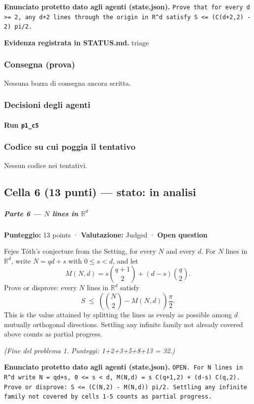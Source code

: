 \documentclass[11pt,a4paper]{article}
\begin{document}
\textbf{Enunciato protetto dato agli agenti (state.json).} \texttt{Prove that for every d \textgreater{}= 2, any d+2 lines through the origin in R\textasciicircum{}d satisfy S \textless{}= (C(d+2,2) - 2) pi/2.}

\textbf{Evidenza registrata in STATUS.md.} triage

\subsubsection{Consegna (prova)}
Nessuna bozza di consegna ancora scritta.

\subsubsection{Decisioni degli agenti}
\paragraph{Run \texttt{p1\_c5}}

\subsubsection{Codice su cui poggia il tentativo}
Nessun codice nei tentativi.

\subsection{Cella 6 (13 punti) — stato: in analisi}
\subparagraph{\texorpdfstring{Parte 6 --- \(N\) lines in
\(\mathbb{R}^d\)}{Parte 6 --- N lines in \textbackslash mathbb\{R\}\^{}d}}\label{parte-6-n-lines-in-mathbbrd}

\textbf{Punteggio:} 13 points · \textbf{Valutazione:} Judged ·
\textbf{Open question}

Fejes Tóth's conjecture from the Setting, for every \(N\) and every
\(d\). For \(N\) lines in \(\mathbb{R}^d\), write \(N = qd + s\) with
\(0 \le s < d\), and let \[
M(N,d) = s \binom{q+1}{2} + (d-s) \binom{q}{2}.
\] Prove or disprove: every \(N\) lines in \(\mathbb{R}^d\) satisfy \[
S \;\le\; \left( \binom{N}{2} - M(N,d) \right) \frac{\pi}{2}.
\] This is the value attained by splitting the lines as evenly as
possible among \(d\) mutually orthogonal directions. Settling any
infinite family not already covered above counts as partial progress.

\emph{(Fine del problema 1. Punteggi: 1+2+3+5+8+13 = 32.)}

\textbf{Enunciato protetto dato agli agenti (state.json).} \texttt{OPEN. For N lines in R\textasciicircum{}d write N = qd+s, 0 \textless{}= s \textless{} d, M(N,d) = s C(q+1,2) + (d-s) C(q,2). Prove or disprove: S \textless{}= (C(N,2) - M(N,d)) pi/2. Settling any infinite family not covered by cells 1-5 counts as partial progress.}
\end{document}
